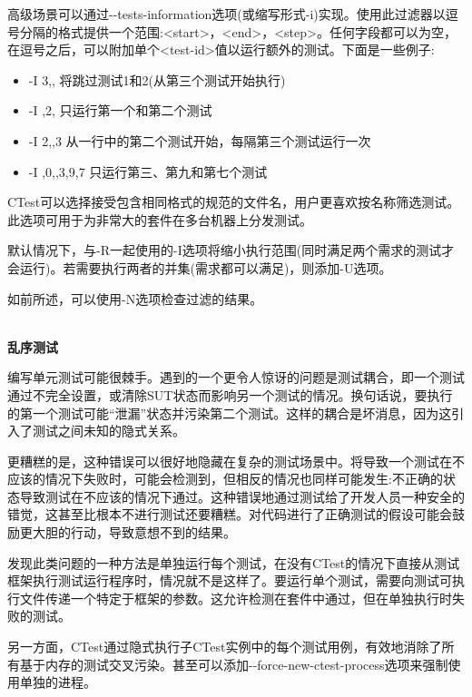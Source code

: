 高级场景可以通过-{}-tests-information选项(或缩写形式-i)实现。使用此过滤器以逗号分隔的格式提供一个范围:<start>，<end>，<step>。任何字段都可以为空，在逗号之后，可以附加单个<test-id>值以运行额外的测试。下面是一些例子:

\begin{itemize}
\item 
-I 3,, 将跳过测试1和2(从第三个测试开始执行)

\item 
-I ,2, 只运行第一个和第二个测试

\item 
-I 2,,3 从一行中的第二个测试开始，每隔第三个测试运行一次

\item 
-I ,0,,3,9,7 只运行第三、第九和第七个测试
\end{itemize}

CTest可以选择接受包含相同格式的规范的文件名，用户更喜欢按名称筛选测试。此选项可用于为非常大的套件在多台机器上分发测试。

默认情况下，与-R一起使用的-I选项将缩小执行范围(同时满足两个需求的测试才会运行)。若需要执行两者的并集(需求都可以满足)，则添加-U选项。

如前所述，可以使用-N选项检查过滤的结果。

\hspace*{\fill} \\ %
\noindent
\textbf{乱序测试}

编写单元测试可能很棘手。遇到的一个更令人惊讶的问题是测试耦合，即一个测试通过不完全设置，或清除SUT状态而影响另一个测试的情况。换句话说，要执行的第一个测试可能“泄漏”状态并污染第二个测试。这样的耦合是坏消息，因为这引入了测试之间未知的隐式关系。

更糟糕的是，这种错误可以很好地隐藏在复杂的测试场景中。将导致一个测试在不应该的情况下失败时，可能会检测到，但相反的情况也同样可能发生:不正确的状态导致测试在不应该的情况下通过。这种错误地通过测试给了开发人员一种安全的错觉，这甚至比根本不进行测试还要糟糕。对代码进行了正确测试的假设可能会鼓励更大胆的行动，导致意想不到的结果。

发现此类问题的一种方法是单独运行每个测试，在没有CTest的情况下直接从测试框架执行测试运行程序时，情况就不是这样了。要运行单个测试，需要向测试可执行文件传递一个特定于框架的参数。这允许检测在套件中通过，但在单独执行时失败的测试。

另一方面，CTest通过隐式执行子CTest实例中的每个测试用例，有效地消除了所有基于内存的测试交叉污染。甚至可以添加-{}-force-new-ctest-process选项来强制使用单独的进程。

